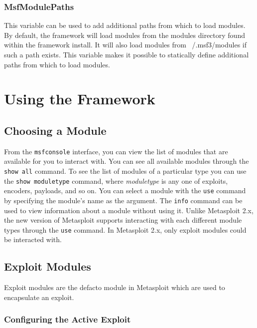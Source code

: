 \documentclass{report}
\begin{document}
	\subsection{MsfModulePaths}
\par
This variable can be used to add additional paths from which to load modules.
By default, the framework will load modules from the modules directory found
within the framework install.  It will also load modules from ~/.msf3/modules
if such a path exists.  This variable makes it possible to statically define
additional paths from which to load modules.

\pagebreak

\chapter{Using the Framework}

	\section{Choosing a Module}
\par
From the \texttt{msfconsole} interface, you can view the list of modules that
are available for you to interact with.  You can see all available modules
through the \texttt{show all} command.  To see the list of modules of a
particular type you can use the \texttt{show moduletype} command, where
\textit{moduletype} is any one of exploits, encoders, payloads, and so on.  
You can select a module with the \texttt{use} command by specifying the
module's name as the argument.  The \texttt{info} command can be used to view
information about a module without using it.  Unlike Metasploit 2.x, the new
version of Metasploit supports interacting with each different module types
through the \texttt{use} command.  In Metasploit 2.x, only exploit modules
could be interacted with.

	\section{Exploit Modules}

\par
Exploit modules are the defacto module in Metasploit which are used to
encapsulate an exploit.

		\subsection{Configuring the Active Exploit}
\end{document}
